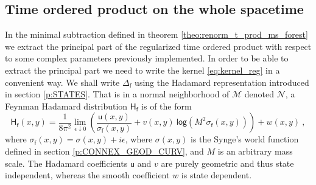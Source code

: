 \documentclass[11pt]{book}
\renewcommand{\log}{\mathsf{log}}
\newcommand{\Mcal}{\mathcal{M}}
\newcommand{\Ncal}{\mathcal{N}}
\newcommand{\Hsf}{\mathsf{H}}
\newcommand{\fsf}{\mathsf{f}}
\newcommand{\usf}{\mathsf{u}}
\theoremstyle{break}
\begin{document}
\subsection{Time ordered product on the whole spacetime}
\label{p:GLOB_TPROD}


In the minimal subtraction defined in theorem \ref{theo:renorm_t_prod_ms_forest} we extract the principal part of the regularized time ordered product with respect to some complex parameters previously implemented. In order to be able to extract the principal part we need to write the kernel \eqref{eq:kernel_reg} in a convenient way. We shall write $\Delta_\fsf$ using the Hadamard representation introduced in section \ref{p:STATES}. That is in a normal neighborhood of $\Mcal$ denoted $\Ncal$, a Feynman Hadamard distribution $\Hsf_\fsf$ is of the form
%
\begin{equation}
\Hsf_\fsf(x,y) = \frac{1}{8\pi^2}  \lim_{\epsilon \downarrow 0} \left( \frac{\usf(x,y)}{\sigma_\fsf(x,y)} + v(x,y) \ \log\left( M^2 \sigma_\fsf(x,y)\right) \right) + w(x,y) \ ,
\label{eq:hadamard_rep} 
\end{equation}
%
where $\sigma_\fsf(x,y) = \sigma(x,y) + i \epsilon$, where $\sigma(x,y)$ is the Synge's world function defined in section \ref{p:CONNEX_GEOD_CURV}, and $M$ is an arbitrary mass scale. The Hadamard coefficients $\usf$ and $v$ are purely geometric and thus state independent, whereas the smooth coefficient $w$ is state dependent.
\end{document}
